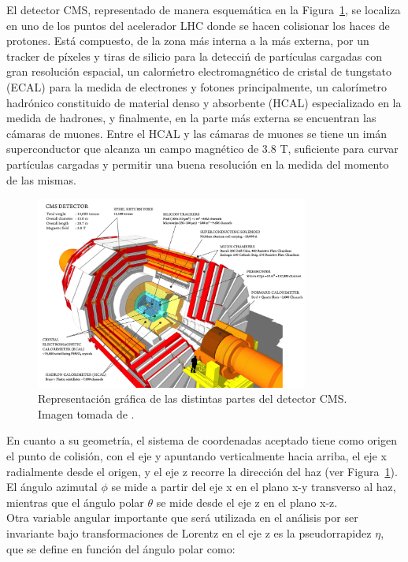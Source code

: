 
El detector CMS, representado de manera esquem\'atica en la Figura~\ref{fig:CMS}, se localiza en uno de los puntos del acelerador LHC donde se hacen colisionar los haces de protones. Est\'a compuesto, de la zona m\'as interna a la m\'as externa, por un tracker de p\'ixeles y tiras de silicio para la detecci\'n de partículas cargadas con gran resoluci\'on espacial, un calor\'metro electromagn\'etico de cristal de tungstato (ECAL) para la medida de electrones y fotones principalmente, un calor\'imetro hadr\'onico constituido de material denso y absorbente (HCAL) especializado en la medida de hadrones, y finalmente, en la parte m\'as externa se encuentran las c\'amaras de muones. Entre el HCAL y las c\'amaras de muones se tiene un im\'an superconductor que alcanza un campo magn\'etico de 3.8 T, suficiente para curvar part\'iculas cargadas y permitir una buena resoluci\'on en la medida del momento de las mismas.

\begin{figure}[h]
\centering
\includegraphics[width=0.80\textwidth]{figures/cms_160312_02.png}
\caption{Representaci\'on gr\'afica de las distintas partes del detector CMS. Imagen tomada de \cite{Sakuma:2665537}.}
\label{fig:CMS}        
\end{figure}

En cuanto a su geometr\'ia, el sistema de coordenadas aceptado tiene como origen el punto de colisi\'on, con el eje y apuntando verticalmente hacia arriba, el eje x radialmente desde el origen, y el eje z recorre la direcci\'on del haz (ver Figura~\ref{fig:CMS}). El \'angulo azimutal $\phi$ se mide a partir del eje x en el plano x-y transverso al haz, mientras que el \'angulo polar $\theta$ se mide desde el eje z en el plano x-z. \\
Otra variable angular importante que ser\'a utilizada en el an\'alisis por ser invariante bajo transformaciones de Lorentz en el eje z es la pseudorrapidez $\eta$, que se define en funci\'on del \'angulo polar como: \\

